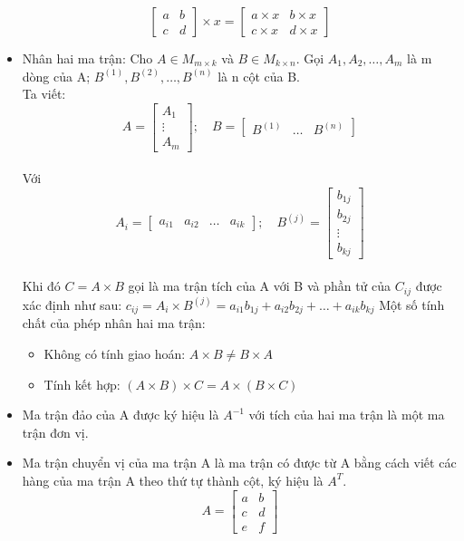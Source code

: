 \begin{itemize}
\[
\begin{bmatrix}
a & b\\
c & d
\end{bmatrix}
\times x =
\begin{bmatrix}
a\times x & b\times x\\
c\times x & d\times x
\end{bmatrix}
\]
\item Nhân hai ma trận: Cho $A \in M_{m\times k}$ và $B \in M_{k\times n}$. Gọi
$A_1, A_2, \dots,A_m$ là m dòng của A; $B^{(1)}, B^{(2)}, \dots, B^{(n)} $ là n cột
của B.\\
Ta viết:
\[
A = 
\begin{bmatrix}
A_{1}\\
\vdots\\
 A_{m}
\end{bmatrix} ;\quad
B = 
\begin{bmatrix}
B^{(1)} & \dots & B^{(n)}
\end{bmatrix}
\]\\
Với 
\[
A_i = 
\begin{bmatrix}
a_{i1} & a_{i2} & \dots & a_{ik}
\end{bmatrix} ;\quad
B^{(j)} = 
\begin{bmatrix}
b_{1j}\\ b_{2j} \\ \vdots \\ b_{kj}
\end{bmatrix}
\]\\
Khi đó $C=A\times B$ gọi là ma trận tích của A với B và phần tử  của $C_{ij}$
được xác định như sau:
$c_{ij} = A_i \times B^{(j)} = a_{i1}b_{1j} + a_{i2}b_{2j} + \dots +
a_{ik}b_{kj}$
Một số tính chất của phép nhân hai ma trận:
\begin{itemize}
  \item Không có tính giao hoán: $A \times B \neq B \times A$
  \item Tính kết hợp: $(A\times B) \times C = A\times (B\times C)$
\end{itemize}
\item Ma trận đảo của A được ký hiệu là $A^{-1}$ với tích của hai ma trận là một
ma trận đơn vị.
\item Ma trận chuyển vị của ma trận A là ma trận có được từ A bằng cách viết các
hàng của ma trận A theo thứ tự thành cột, ký hiệu là $A^T$.
\[
A = 
\begin{bmatrix}
a & b\\
c & d\\
e & f
\end{bmatrix}
\]
\end{itemize}

